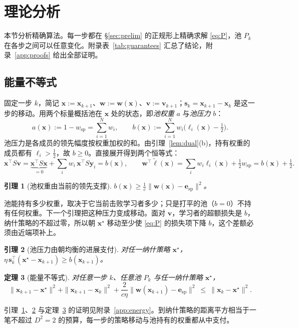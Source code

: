\documentclass{article}
\theoremstyle{plain}
\newtheorem{theorem}{定理}[section]
\newtheorem{lemma}[theorem]{引理}
\theoremstyle{remark}
\newcommand{\bx}{{\bm{x}}}
\newcommand{\by}{{\bm{y}}}
\newcommand{\bv}{{\bm{v}}}
\newcommand{\bw}{{\bm{w}}}
\newcommand{\be}{{\bm{e}}}
\newcommand{\bell}{{\bm{\ell}}}
\newcommand{\aug}{\tilde{\bell}}
\newcommand{\xs}{\bx^{\star}}
\newcommand{\dx}{{\bm{s}}}
\newcommand{\esp}{\be_{\mathrm{sp}}}
\newcommand{\wsp}{w_{\mathrm{sp}}}
\begin{document}
\section{理论分析}
\label{sec:theory}

本节分析精确算法。每一步都在 \S\ref{sec:prelim} 的正规形上精确求解 \eqref{eq:P}，池 $P_k$ 在各步之间可以任意变化。附录表~\ref{tab:guarantees} 汇总了结论，附录~\ref{app:proofs} 给出全部证明。


\subsection{能量不等式}
\label{sec:energy}

固定一步 $k$，简记 $\bx:=\bx_{k+1}$、$\bw:=\bw(\bx)$、$\bv:=\bv_{k+1}$；$\dx_k=\bx_{k+1}-\bx_k$ 是这一步的移动。用两个标量概括池在 $\bx$ 处的状态，即\emph{池权重} $a$ 与\emph{池压力} $b$：
\[
a(\bx):=1-\wsp=\sum_{i=1}^Nw_i,\qquad
b(\bx):=\sum_{i=1}^Nw_i\big(\ell_i(\bx)-\tfrac12\big).
\]
池压力是各成员的领先幅度按权重加权的和。由引理~\ref{lem:dual}(b)，持有权重的成员都有 $\ell_i>\tfrac12$，故 $b\ge0$。直接展开得到两个恒等式：
\begin{equation}
\bx^\top S\bv=\underbrace{\bx^\top S\bx}_{=0}+\textstyle\sum_iw_i\,\bx^\top S\by_i=b(\bx),\qquad
\bw^\top\aug(\bx)=\textstyle\sum_iw_i\ell_i(\bx)+\tfrac12\wsp=b(\bx)+\tfrac12 .
\label{eq:identities}
\end{equation}

\begin{lemma}[池权重由当前的领先支撑]
\label{lem:A}
$b(\bx)\ge\tfrac1c\|\bw(\bx)-\esp\|^2$。
\end{lemma}
池能持有多少权重，取决于它当前击败学习者多少；只是打平的池（$b=0$）不持有任何权重。下一个引理把这种压力变成移动。面对 $\bv$，学习者的超额损失是 $b$，纳什策略的不超过零，所以朝 $\xs$ 移动至少使 \eqref{eq:P} 的损失项下降 $b$，这个差额必须由近端项补上。

\begin{lemma}[池压力由朝均衡的进展支付]
\label{lem:B}
对任一纳什策略 $\xs$，$\eta\,\dx_k^\top(\xs-\bx_{k+1})\ge b(\bx_{k+1})$。
\end{lemma}

\begin{theorem}[能量不等式]
\label{thm:energy}
对任意一步 $k$、任意池 $P_k$ 与任一纳什策略 $\xs$，
\begin{equation}
\|\bx_{k+1}-\xs\|^2+\|\bx_{k+1}-\bx_k\|^2+\frac{2}{c\eta}\|\bw(\bx_{k+1})-\esp\|^2\ \le\ \|\bx_k-\xs\|^2 .
\label{eq:energy}
\end{equation}
\end{theorem}
引理~\ref{lem:A}、\ref{lem:B} 与定理~\ref{thm:energy} 的证明见附录~\ref{app:energy}。到纳什策略的距离平方相当于一笔不超过 $D^2=2$ 的预算，每一步的策略移动与池持有的权重都从中支付。
\end{document}
